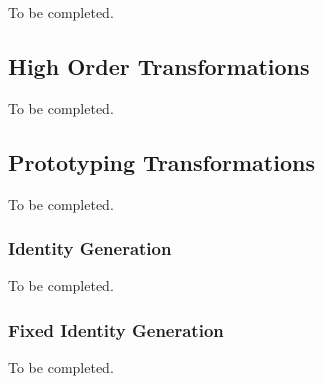 To be completed.




\clearpage
\subsection{High Order Transformations}

To be completed.



\clearpage
\subsection{Prototyping Transformations}

To be completed.

\clearpage
\subsubsection{Identity Generation}

To be completed.

\clearpage
\subsubsection{Fixed Identity Generation}

To be completed.

